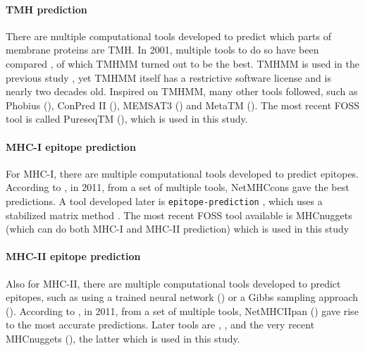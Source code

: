 \paragraph{TMH prediction}

There are multiple computational tools developed to predict which
parts of membrane proteins are TMH.
In 2001, multiple tools to do so have been compared \cite{moller2001evaluation},
of which TMHMM \cite{krogh2001predicting} turned out to be the best.
TMHMM is used in the previous study \cite{bianchi2017},
yet TMHMM itself has a restrictive software license and is nearly two
decades old. 
Inspired on TMHMM, many other tools followed, such as 
Phobius (\cite{kall2004combined}),
ConPred II (\cite{arai2004conpred}),
MEMSAT3 (\cite{jones2007improving})
and MetaTM (\cite{klammer2009metatm}).
The most recent FOSS tool is called PureseqTM (\cite{wang2019efficient}),
which is used in this study.

\paragraph{MHC-I epitope prediction}

For MHC-I, there are multiple computational tools developed 
to predict epitopes. 
According to \cite{lundegaard2011prediction}, in 2011,
from a set of multiple tools, 
NetMHCcons \cite{karosiene2012netmhccons} gave the best predictions.
A tool developed later is \verb;epitope-prediction; \cite{bianchi2017},
which uses a stabilized matrix method \cite{kim2009derivation}.
The most recent FOSS tool available is 
MHCnuggets \cite{shao2020high} (which can do both MHC-I 
and MHC-II prediction) which is used in this study

\paragraph{MHC-II epitope prediction}

Also for MHC-II, there are multiple computational tools developed 
to predict epitopes,
such as using a trained neural network (\cite{nielsen2003reliable})
or a Gibbs sampling approach (\cite{nielsen2004improved}).
According to \cite{lundegaard2011prediction}, in 2011,
from a set of multiple tools, 
NetMHCIIpan (\cite{nielsen2008quantitative,karosiene2013netmhciipan})
gave rise to the most accurate predictions.
Later tools are \cite{zhang2013predicting},
\cite{trolle2014nettepi}, \cite{zhang2015accurate}
and the very recent MHCnuggets (\cite{shao2020high}),
the latter which is used in this study.

